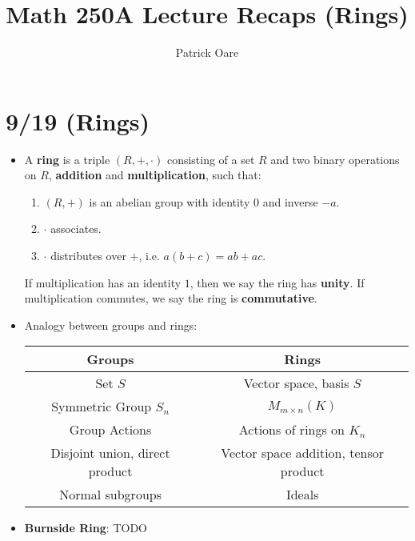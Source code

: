 \documentclass[11pt, oneside]{amsart}   	%
\title{Math 250A Lecture Recaps (Rings)}
\author{Patrick Oare}
\theoremstyle{definition}
\begin{document}
\maketitle

\section{9/19 (Rings)}

\begin{itemize}

	\item A \textbf{ring} is a triple $(R, +, \cdot)$ consisting of a set $R$ and two binary operations on $R$, \textbf{addition} and \textbf{multiplication}, 
	such that:
		
		\begin{enumerate}
		
			\item $(R, +)$ is an abelian group with identity $0$ and inverse $-a$.
			
			\item $\cdot$ associates.
			
			\item $\cdot$ distributes over $+$, i.e. $a(b + c) = ab + ac$.
		
		\end{enumerate}
		
	If multiplication has an identity $1$, then we say the ring has \textbf{unity}. If multiplication commutes, we say the ring is \textbf{commutative}. 
	
	\item Analogy between groups and rings:
	
	\begin{table}[H]
	\centering
		\begin{tabular}{ | c | c |}
			\hline
			Groups & Rings \\
			\hline
			Set $S$ & Vector space, basis $S$ \\
			\hline
			Symmetric Group $S_n$ & $M_{m\times n}(K)$ \\
			\hline
			Group Actions & Actions of rings on $K_n$ \\
			\hline
			Disjoint union, direct product & Vector space addition, tensor product \\
			\hline
			Normal subgroups & Ideals \\
			\hline
		\end{tabular}
	\end{table}
	
	\item \textbf{Burnside Ring}: TODO
	

\end{itemize}
\end{document}
